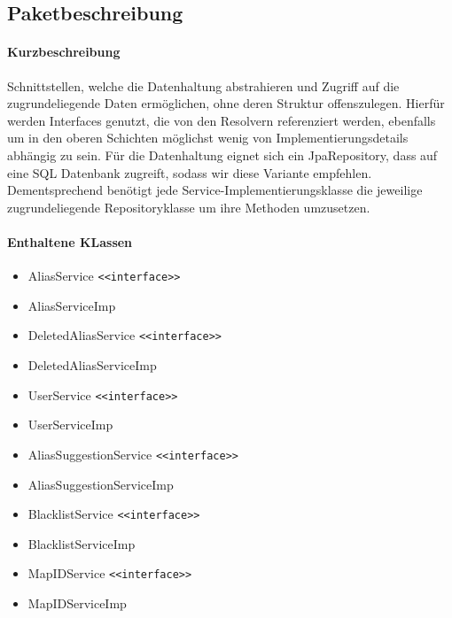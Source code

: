 \subsection*{Paketbeschreibung}%
\paragraph*{Kurzbeschreibung}
Schnittstellen, welche die Datenhaltung abstrahieren und Zugriff auf die zugrundeliegende Daten ermöglichen, ohne deren Struktur offenszulegen.
Hierfür werden Interfaces genutzt, die von den Resolvern referenziert werden, ebenfalls um in den oberen Schichten möglichst 
wenig von Implementierungsdetails abhängig zu sein. Für die Datenhaltung eignet sich ein JpaRepository, dass auf 
eine SQL Datenbank zugreift, sodass wir diese Variante empfehlen. Dementsprechend benötigt jede Service-Implementierungsklasse die jeweilige 
zugrundeliegende Repositoryklasse um ihre Methoden umzusetzen. 
\paragraph*{Enthaltene KLassen}
\begin{itemize}
    \item AliasService \texttt{<<interface>>}
    \item AliasServiceImp
    \item DeletedAliasService \texttt{<<interface>>}
    \item DeletedAliasServiceImp
    \item UserService \texttt{<<interface>>}
    \item UserServiceImp
    \item AliasSuggestionService \texttt{<<interface>>}
    \item AliasSuggestionServiceImp
    \item BlacklistService \texttt{<<interface>>}
    \item BlacklistServiceImp
    \item MapIDService \texttt{<<interface>>}
    \item MapIDServiceImp
\end{itemize}

